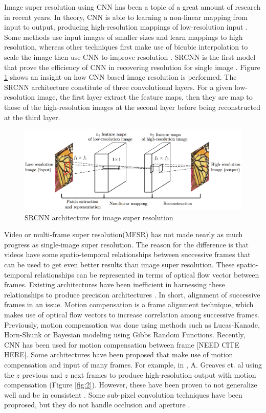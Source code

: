 \documentclass[10pt]{article}
\begin{document}
Image super resolution using CNN has been a topic of a great amount of research in recent years. In theory, CNN is able to learning a non-linear mapping from input to output, producing high-resolution mappings of low-resolution input \cite{dong2016image}. Some methods use input images of smaller sizes and learn mappings to high resolution, whereas other techniques first make use of bicubic interpolation to scale the image then use CNN to improve resolution \cite{dong2016image}. SRCNN is the first model that prove the efficiency of CNN in recovering resolution for single image \cite{dong2016image}. Figure \ref{fig:1} shows an insight on how CNN based image resolution is performed. The SRCNN architecture constitute of three convolutional layers. For a given low-resolution image, the first layer extract the feature maps, then they are map to those of the high-resolution images at the second layer before being reconstructed at the third layer. 

\begin{figure}[H]
    \centering
    \includegraphics[scale=0.4]{figs/cnn.png}
    \caption{SRCNN architecture for image super resolution}
    \label{fig:1}
\end{figure}

Video or multi-frame super resolution(MFSR) has not made nearly as much progress as single-image super resolution. The reason for the difference is that videos have some spatio-temporal relationships between successive frames that can be used to get even better results than image super resolution. These spatio-temporal relationships can be represented in terms of optical flow vector between frames. Existing architectures have been inefficient in harnessing these relationships to produce precision architectures \cite{caballero2016real}. In short, alignment of successive frames in an issue. Motion compensation is a frame alignment technique, which makes use of optical flow vectors to increase correlation among successive frames. Previously, motion compensation was done using methods such as Lucas-Kanade, Horn-Shunk or Bayesian modeling using Gibbs Random Functions. Recently, CNN has been used for motion compensation between frame [NEED CITE HERE]. Some architectures have been proposed that make use of motion compensation and input of many frames. For example, in \cite{greavesmulti}, A. Greaves et. al using the $z$ previous and $z$ next frames to produce high-resolution output with motion compensation (Figure \ref{fig:2}). However, these have been proven to not generalize well and be in consistent \cite{tao2017detail}. Some sub-pixel convolution techniques have been proprosed, but they do not handle occlusion and aperture \cite{shi2016real}.
\end{document}
